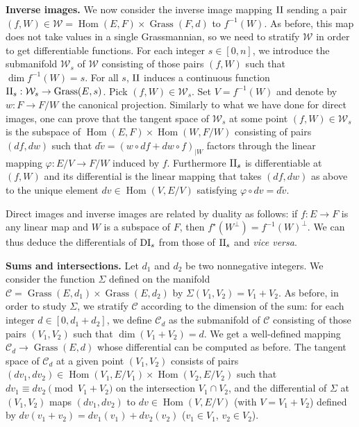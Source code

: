 \documentclass{sig-alternate}
\DeclareMathOperator{\Hom}{Hom}
\DeclareMathOperator{\Grass}{Grass}
\newcommand{\DI}{\text{\rm DI}}
\newcommand{\II}{\text{\rm II}}
\begin{document}
\smallskip

\noindent
{\bf Inverse images.}
We now consider the inverse image mapping $\II$ sending a 
pair $(f,W) \in \mathcal W = \Hom(E,F) \times \Grass(F,d)$ to 
$f^{-1}(W)$. As before, this map does not take values in a single 
Grassmannian, so we need to stratify $\mathcal W$ in order to get 
differentiable functions. For each integer $s \in [0,n]$, we introduce 
the submanifold $\mathcal W_s$ of $\mathcal W$ consisting of those 
pairs $(f,W)$ such that $\dim f^{-1}(W) = s$. For all $s$, $\II$ 
induces a continuous function
$\II_s : \mathcal W_s \to \Grass(E,s)$.
Pick $(f,W) \in \mathcal W_s$. Set $V = f^{-1}(W)$ and denote by $w : F 
\to F/W$ the canonical projection.
Similarly to what we have done for direct images, one can prove that
the tangent space of $\mathcal W_s$ at some point $(f,W) \in \mathcal
W_s$ is the subspace of $\Hom(E,F) \times \Hom(W,F/W)$ consisting of 
pairs $(df,dw)$ such that
$d \tilde v = (w \circ df + dw \circ f)_{|W}$
factors through the linear mapping $\varphi : E/V \to F/W$ induced by 
$f$. Furthermore $\II_s$ is differentiable at $(f,W)$ and its 
differential is the linear mapping that takes $(df,dw)$ as above to the 
unique element $dv \in \Hom(V,E/V)$ satisfying $\varphi \circ dv =
d\tilde v$.

Direct images and inverse images are related by duality
as follows: if $f : E \to F$ is any linear map and $W$ is a subspace
of $F$, then $f^\star(W^\perp) = f^{-1}(W)^\perp$. We 
can thus deduce the differentials of $\DI_s$ from those of $\II_s$ and 
\emph{vice versa}.


\smallskip

\noindent
{\bf Sums and intersections.}
Let $d_1$ and $d_2$ be two nonnegative integers. We consider the 
function $\Sigma$ defined on the manifold $\mathcal C = \Grass(E,d_1) 
\times \Grass(E,d_2)$ by $\Sigma(V_1, V_2) = V_1 + V_2$. As before, in 
order to study $\Sigma$, we stratify $\mathcal C$ according to the 
dimension of the sum: for each integer $d \in [0, d_1+d_2]$, we define 
$\mathcal C_d$ as the submanifold of $\mathcal C$ consisting of those 
pairs $(V_1, V_2)$ such that $\dim(V_1 + V_2) = d$. We get a 
well-defined mapping $\mathcal C_d \to \Grass(E,d)$ whose differential
can be computed as before. The
tangent space of $\mathcal C_d$ at a given point $(V_1, V_2)$ consists 
of pairs $(dv_1, dv_2) \in \Hom(V_1, E/V_1)
\times \Hom(V_2, E/V_2)$ such that $dv_1 \equiv dv_2 \pmod{V_1 + V_2}$ 
on the intersection $V_1 \cap V_2$, and the differential of $\Sigma$
at $(V_1, V_2)$ maps $(dv_1, dv_2)$ to $dv \in \Hom(V, E/V)$ (with $V
= V_1 + V_2$) defined by $dv(v_1 + v_2) = dv_1(v_1) + dv_2(v_2)$ ($v_1
\in V_1$, $v_2 \in V_2$).
\end{document}
